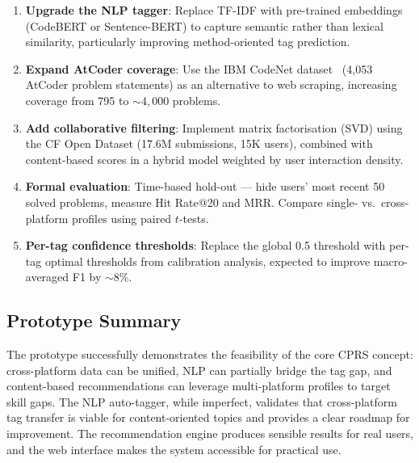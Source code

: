 \documentclass[12pt,a4paper]{article}
\begin{document}
\begin{enumerate}
    \item \textbf{Upgrade the NLP tagger}: Replace TF-IDF with pre-trained embeddings (CodeBERT or Sentence-BERT) to capture semantic rather than lexical similarity, particularly improving method-oriented tag prediction.

    \item \textbf{Expand AtCoder coverage}: Use the IBM CodeNet dataset~\cite{puri2021} (4,053 AtCoder problem statements) as an alternative to web scraping, increasing coverage from 795 to ${\sim}4{,}000$ problems.

    \item \textbf{Add collaborative filtering}: Implement matrix factorisation (SVD) using the CF Open Dataset (17.6M submissions, 15K users), combined with content-based scores in a hybrid model weighted by user interaction density.

    \item \textbf{Formal evaluation}: Time-based hold-out --- hide users' most recent 50 solved problems, measure Hit Rate@20 and MRR. Compare single- vs.\ cross-platform profiles using paired $t$-tests.

    \item \textbf{Per-tag confidence thresholds}: Replace the global 0.5 threshold with per-tag optimal thresholds from calibration analysis, expected to improve macro-averaged F1 by ${\sim}8\%$.
\end{enumerate}

\subsection{Prototype Summary}

The prototype successfully demonstrates the feasibility of the core CPRS concept: cross-platform data can be unified, NLP can partially bridge the tag gap, and content-based recommendations can leverage multi-platform profiles to target skill gaps. The NLP auto-tagger, while imperfect, validates that cross-platform tag transfer is viable for content-oriented topics and provides a clear roadmap for improvement. The recommendation engine produces sensible results for real users, and the web interface makes the system accessible for practical use.
\end{document}
